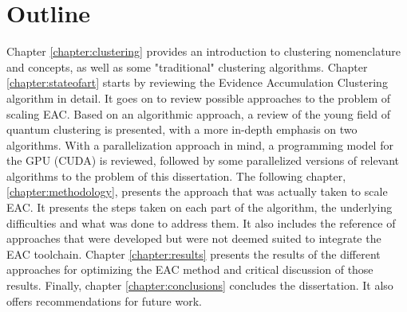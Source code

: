 \section{Outline}

Chapter \ref{chapter:clustering} provides an introduction to clustering nomenclature and concepts, as well as some "traditional" clustering algorithms.
Chapter \ref{chapter:stateofart} starts by reviewing the Evidence Accumulation Clustering algorithm in detail.
It goes on to review possible approaches to the problem of scaling EAC.
Based on an algorithmic approach, a review of the young field of quantum clustering is presented, with a more in-depth emphasis on two algorithms.
With a parallelization approach in mind, a programming model for the GPU (CUDA) is reviewed, followed by some parallelized versions of relevant algorithms to the problem of this dissertation.
The following chapter, \ref{chapter:methodology}, presents the approach that was actually taken to scale EAC.
It presents the steps taken on each part of the algorithm, the underlying difficulties and what was done to address them.
It also includes the reference of approaches that were developed but were not deemed suited to integrate the EAC toolchain.
Chapter \ref{chapter:results} presents the results of the different approaches for optimizing the EAC method and critical discussion of those results.
Finally, chapter \ref{chapter:conclusions} concludes the dissertation.
It also offers recommendations for future work.